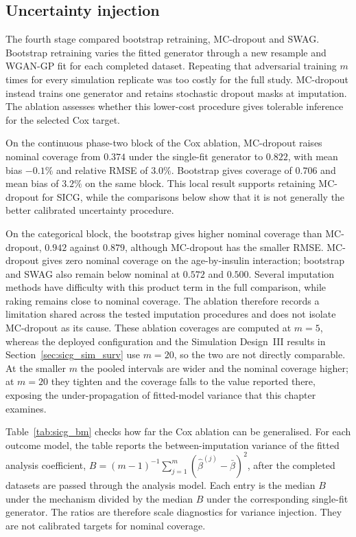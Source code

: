 \subsection{Uncertainty injection}
\label{sec:sicg_ablation_uncertainty}

The fourth stage compared bootstrap retraining, MC-dropout and SWAG. Bootstrap retraining varies the fitted generator through a new resample and WGAN-GP fit for each completed dataset. Repeating that adversarial training \(m\) times for every simulation replicate was too costly for the full study. MC-dropout instead trains one generator and retains stochastic dropout masks at imputation. The ablation assesses whether this lower-cost procedure gives tolerable inference for the selected Cox target.

On the continuous phase-two block of the Cox ablation, MC-dropout raises nominal coverage from \(0.374\) under the single-fit generator to \(0.822\), with mean bias \(-0.1\%\) and relative RMSE of \(3.0\%\). Bootstrap gives coverage of \(0.706\) and mean bias of \(3.2\%\) on the same block. This local result supports retaining MC-dropout for SICG, while the comparisons below show that it is not generally the better calibrated uncertainty procedure.

On the categorical block, the bootstrap gives higher nominal coverage than MC-dropout, \(0.942\) against \(0.879\), although MC-dropout has the smaller RMSE. MC-dropout gives zero nominal coverage on the age-by-insulin interaction; bootstrap and SWAG also remain below nominal at \(0.572\) and \(0.500\). Several imputation methods have difficulty with this product term in the full comparison, while raking remains close to nominal coverage. The ablation therefore records a limitation shared across the tested imputation procedures and does not isolate MC-dropout as its cause. These ablation coverages are computed at $m = 5$, whereas the deployed configuration and the Simulation Design~III results in Section~\ref{sec:sicg_sim_surv} use $m = 20$, so the two are not directly comparable. At the smaller $m$ the pooled intervals are wider and the nominal coverage higher; at $m = 20$ they tighten and the coverage falls to the value reported there, exposing the under-propagation of fitted-model variance that this chapter examines.

Table~\ref{tab:sicg_bm} checks how far the Cox ablation can be generalised. For each outcome model, the table reports the between-imputation variance of the fitted analysis coefficient,
\(B=(m-1)^{-1}\sum_{j=1}^m(\hat\beta^{(j)}-\bar\beta)^2\),
after the completed datasets are passed through the analysis model. Each entry is the median \(B\) under the mechanism divided by the median \(B\) under the corresponding single-fit generator. The ratios are therefore scale diagnostics for variance injection. They are not calibrated targets for nominal coverage.

